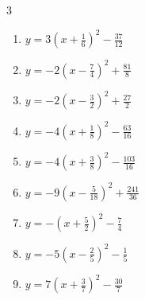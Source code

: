 \begin{multicols}{3}
\begin{enumerate}

  \item $\displaystyle y=3\left( x+\frac{1}{6}\right)^{2}-\frac{37}{12}$


  \item $\displaystyle y=-2\left( x-\frac{7}{4}\right)^{2}+\frac{81}{8}$


  \item $\displaystyle y=-2\left( x-\frac{3}{2}\right)^{2}+\frac{27}{2}$


  \item $\displaystyle y=-4\left( x+\frac{1}{8}\right)^{2}-\frac{63}{16}$


  \item $\displaystyle y=-4\left( x+\frac{3}{8}\right)^{2}-\frac{103}{16}$


  \item $\displaystyle y=-9\left( x-\frac{5}{18}\right)^{2}+\frac{241}{36}$


  \item $\displaystyle y=-\left( x+\frac{5}{2}\right)^{2}-\frac{7}{4}$


\columnbreak %

  \item $\displaystyle y=-5\left( x-\frac{2}{5}\right)^{2}-\frac{1}{5}$


  \item $\displaystyle y=7\left( x+\frac{3}{7}\right)^{2}-\frac{30}{7}$



\end{enumerate}
\end{multicols}

